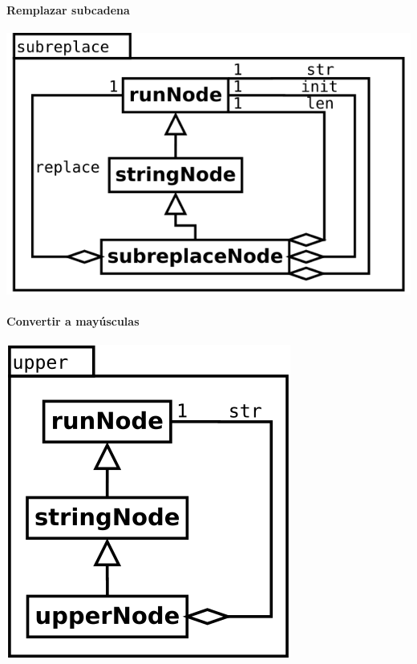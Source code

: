 \paragraph {Remplazar subcadena}
\begin{center}
\includegraphics[scale=0.4]{subreplace.png} \\
\end{center}

\paragraph {Convertir a mayúsculas}
\begin{center}
\includegraphics[scale=0.4]{upper.png} \\
\end{center}

